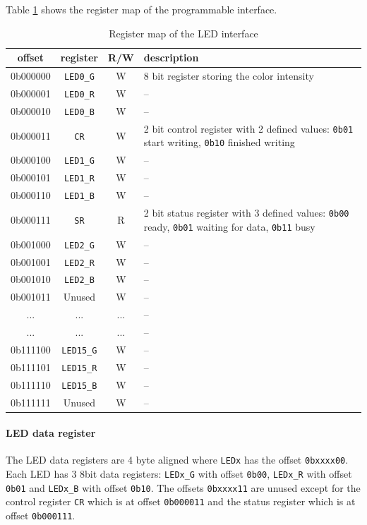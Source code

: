 \documentclass{article}
\begin{document}
Table \ref{tab:regs} shows the register map of the programmable interface.
\begin{table}[H]
    \centering
    
    \begin{tabular}{|c|c|c|p{70mm}|}
    \hline
     offset & register & R/W & description \\
    \hline
    \hline
     0b000000 & \verb'LED0_G' & W & 8 bit register storing the color intensity \\
     0b000001 & \verb'LED0_R' & W & -- \\
     0b000010 & \verb'LED0_B' & W & -- \\
     0b000011 & \verb'CR' & W & 2 bit control register with 2 defined values: \verb'0b01' start writing, \verb'0b10' finished writing \\
     0b000100 & \verb'LED1_G' & W & -- \\
     0b000101 & \verb'LED1_R' & W & -- \\
     0b000110 & \verb'LED1_B' & W & -- \\
     0b000111 & \verb'SR' & R & 2 bit status register with 3 defined values: \verb'0b00' ready, \verb'0b01' waiting for data, \verb'0b11' busy \\
     0b001000 & \verb'LED2_G' & W & -- \\
     0b001001 & \verb'LED2_R' & W & -- \\
     0b001010 & \verb'LED2_B' & W & -- \\
     0b001011 & Unused & W & -- \\
     ... & ... & ... &  -- \\
     ... & ... & ... & -- \\
     0b111100 & \verb'LED15_G' & W & -- \\
     0b111101 & \verb'LED15_R' & W & -- \\
     0b111110 & \verb'LED15_B' & W & -- \\
     0b111111 & Unused & W & -- \\
     \hline
     
\end {tabular}
\caption{Register map of the LED interface}
\label{tab:regs}
\end{table}

\paragraph{LED data register} The LED data registers are 4 byte aligned where \verb'LEDx' has the offset \verb'0bxxxx00'.
Each LED has 3 8bit data registers: \verb'LEDx_G' with offset \verb'0b00', \verb'LEDx_R' with offset \verb'0b01' and \verb'LEDx_B' with offset \verb'0b10'. The offsets \verb'0bxxxx11' are unused except for the control register \verb'CR' which is at offset \verb'0b000011' and the status register which is at offset  \verb'0b000111'.
\end{document}
